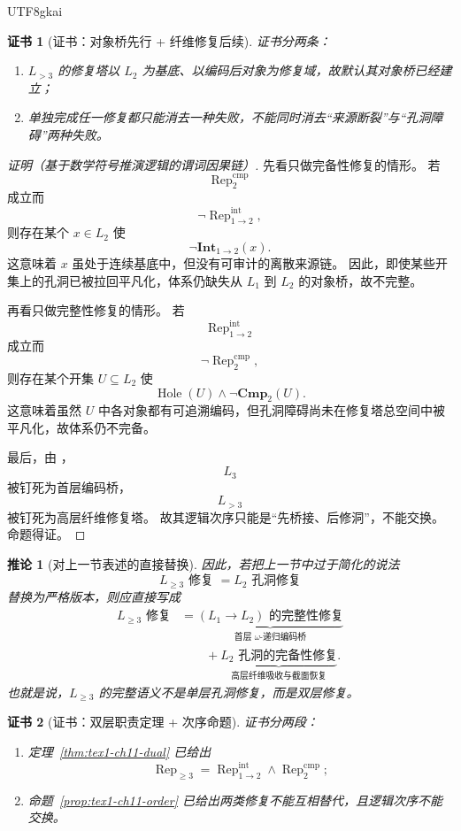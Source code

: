\documentclass[12pt]{article}
\newtheorem{corollary}{推论}[section]
\newtheorem{Certificate}{证书}[section]
\newcommand{\Hole}{\operatorname{Hole}}
\begin{document}
\begin{CJK*}{UTF8}{gkai}
\begin{Certificate}[证书：对象桥先行 + 纤维修复后续]
\label{cert:tex1-ch11-order}
证书分两条：
\begin{enumerate}
  \item \(L_{>3}\) 的修复塔以 \(L_2\) 为基底、以编码后对象为修复域，故默认其对象桥已经建立；
  \item 单独完成任一修复都只能消去一种失败，不能同时消去“来源断裂”与“孔洞障碍”两种失败。
\end{enumerate}
\end{Certificate}

\begin{proof}[证明（基于数学符号推演逻辑的谓词因果链）]
先看只做完备性修复的情形。
若
\[
  \operatorname{Rep}^{\mathrm{cmp}}_2
\]
成立而
\[
  \neg \operatorname{Rep}^{\mathrm{int}}_{1\to2},
\]
则存在某个 \(x\in L_2\) 使
\[
  \neg \mathbf{Int}_{1\to2}(x).
\]
这意味着 \(x\) 虽处于连续基底中，但没有可审计的离散来源链。
因此，即使某些开集上的孔洞已被拉回平凡化，体系仍缺失从 \(L_1\) 到 \(L_2\) 的对象桥，故不完整。

再看只做完整性修复的情形。
若
\[
  \operatorname{Rep}^{\mathrm{int}}_{1\to2}
\]
成立而
\[
  \neg \operatorname{Rep}^{\mathrm{cmp}}_2,
\]
则存在某个开集 \(U\subseteq L_2\) 使
\[
  \Hole(U)\wedge \neg \mathbf{Cmp}_2(U).
\]
这意味着虽然 \(U\) 中各对象都有可追溯编码，但孔洞障碍尚未在修复塔总空间中被平凡化，故体系仍不完备。

最后，由 \cite{RepoTex41HomotopyRepairBundle}，
\[
  L_3
\]
被钉死为首层编码桥，
\[
  L_{>3}
\]
被钉死为高层纤维修复塔。
故其逻辑次序只能是“先桥接、后修洞”，不能交换。
命题得证。
\end{proof}

\begin{corollary}[对上一节表述的直接替换]
\label{cor:tex1-ch11-replace}
因此，若把上一节中过于简化的说法
\[
  L_{\ge3}\text{ 修复 }=L_2\text{ 孔洞修复}
\]
替换为严格版本，则应直接写成
\[
  \boxed{
    \begin{aligned}
      L_{\ge3}\text{ 修复}
      &=
      \underbrace{\text{$(L_1\to L_2)$ 的完整性修复}}_{\text{首层 }\omega\text{-递归编码桥}}\\
      &\qquad+
      \underbrace{\text{$L_2$ 孔洞的完备性修复}}_{\text{高层纤维吸收与截面恢复}}.
    \end{aligned}
  }
\]
也就是说，\(L_{\ge3}\) 的完整语义不是单层孔洞修复，而是双层修复。
\end{corollary}

\begin{Certificate}[证书：双层职责定理 + 次序命题]
\label{cert:tex1-ch11-replace}
证书分两段：
\begin{enumerate}
  \item 定理~\ref{thm:tex1-ch11-dual} 已给出
  \[
    \operatorname{Rep}_{\ge3}
    =
    \operatorname{Rep}^{\mathrm{int}}_{1\to2}
    \wedge
    \operatorname{Rep}^{\mathrm{cmp}}_{2};
  \]
  \item 命题~\ref{prop:tex1-ch11-order} 已给出两类修复不能互相替代，且逻辑次序不能交换。
\end{enumerate}
\end{Certificate}


\end{CJK*}
\end{document}
